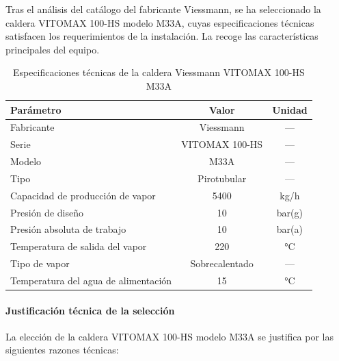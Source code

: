 Tras el análisis del catálogo del fabricante Viessmann, se ha seleccionado la caldera VITOMAX 100-HS modelo M33A, cuyas especificaciones técnicas satisfacen los requerimientos de la instalación. La  recoge las características principales del equipo.

\begin{table}[H]
	\centering
	\caption{Especificaciones técnicas de la caldera Viessmann VITOMAX 100-HS M33A}
	\label{tab:especificaciones-caldera-vitomax}
	\begin{tabular}{lcc}
		\toprule
		\textbf{Parámetro}                   & \textbf{Valor} & \textbf{Unidad} \\
		\midrule
		Fabricante                           & Viessmann      & ---             \\
		Serie                                & VITOMAX 100-HS & ---             \\
		Modelo                               & M33A           & ---             \\
		Tipo                                 & Pirotubular    & ---             \\
		Capacidad de producción de vapor     & 5400           & kg/h            \\
		Presión de diseño                    & 10             & bar(g)          \\
		Presión absoluta de trabajo          & 10             & bar(a)          \\
		Temperatura de salida del vapor      & 220            & °C              \\
		Tipo de vapor                        & Sobrecalentado & ---             \\
		Temperatura del agua de alimentación & 15             & °C              \\
		\bottomrule
	\end{tabular}
\end{table}

\paragraph{Justificación técnica de la selección}

La elección de la caldera VITOMAX 100-HS modelo M33A se justifica por las siguientes razones técnicas:

